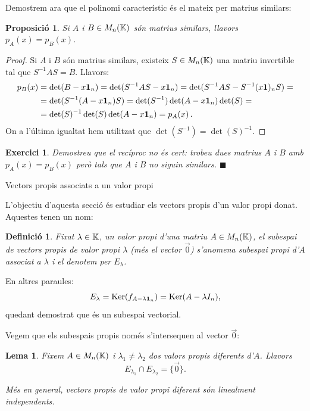 \documentclass[
  11pt,
]{book}
\makeatletter
\numberwithin{dummy}{section}
\theoremstyle{maincolornumbox}
\newtheorem{exerciseT}{Exercici}[chapter]
\theoremstyle{blacknumex}
\theoremstyle{blacknumbox}
\newtheorem{definitionT}{Definició}[chapter]
\theoremstyle{maincolornum}
\newtheorem{propositionT}{Proposició}[chapter]
\newtheorem{lemmaT}{Lema}[chapter]
\newenvironment{proposition}{\begin{pBox}\begin{propositionT}}{\end{propositionT}\end{pBox}}
\newenvironment{lemma}{\begin{pBox}\begin{lemmaT}}{\end{lemmaT}\end{pBox}}
\newenvironment{exercise}{\begin{eBox}\begin{exerciseT}}{\hfill{\color{maincolor}\tiny\ensuremath{\blacksquare}}\end{exerciseT}\end{eBox}}
\newenvironment{definition}{\begin{dBox}\begin{definitionT}}{\end{definitionT}\end{dBox}}
\renewcommand{\section}{\@startsection{section}{1}{\z@}
{-4ex \@plus -1ex \@minus -.4ex}
{1ex \@plus.2ex }
{\normalfont\large\sffamily\bfseries}}
\newlength\esp
\makeatother
\begin{document}
Demostrem ara que el polinomi característic és el mateix per matrius
similars:

\begin{proposition}
Si \(A\) i \(B\in M_n(\mathbb{K})\) són matrius similars, llavors \(p_A(x)=p_B(x)\).
\end{proposition}

\begin{proof}
Si \(A\) i \(B\) són matrius similars, existeix \(S\in M_n(\mathbb{K})\) una
matriu invertible tal que \(S^{-1}AS=B\). Llavors: \begin{align*}
p_B(x) & =\det(B-x\mathbf{1}_n)=\det(S^{-1}AS-x\mathbf{1}_n)=\det(S^{-1}AS-S^{-1}(x\mathbf{1})_nS)=\\ & = \det(S^{-1}(A-x\mathbf{1}_n)S)= \det(S^{-1})\det(A-x\mathbf{1}_n)\det(S)=\\
 & = \det(S)^{-1}\det(S)\det(A-x\mathbf{1}_n) = p_A(x) \, .
\end{align*} On a l'última igualtat hem utilitzat que
\(\det(S^{-1})=\det(S)^{-1}\).
\end{proof}

\begin{exercise}
Demostreu que el recíproc no és cert: trobeu dues matrius \(A\) i \(B\) amb
\(p_A(x)=p_B(x)\) però tals que \(A\) i \(B\) no siguin similars.
\end{exercise}

\section{Vectors propis associats a un valor propi}\label{vectors-propis-associats-a-un-valor-propi}

L'objectiu d'aquesta secció és estudiar els vectors propis d'un valor
propi donat. Aquestes tenen un nom:

\begin{definition}
Fixat \(\lambda\in\mathbb{K}\), un valor propi d'una matriu \(A\in M_n(\mathbb{K})\), el
subespai de vectors propis de valor propi \(\lambda\) (més el vector
\(\vec 0\)) s'anomena \emph{subespai propi d'\(A\) associat a \(\lambda\)} i el
denotem per \(E_\lambda\).
\end{definition}

En altres paraules:
\[E_\lambda=\operatorname{Ker}(f_{A-\lambda\mathbf{1}_n})=\operatorname{Ker}(A-\lambda I_n) ,\] quedant
demostrat que és un subespai vectorial.

Vegem que els subespais propis només s'intersequen al vector \(\vec 0\):

\begin{lemma}
\protect\hypertarget{lem:veps-vap-dif-LI}{}\label{lem:veps-vap-dif-LI}Fixem
\(A\in M_n(\mathbb{K})\) i \(\lambda_1\neq\lambda_2\) dos valors propis diferents
d'\(A\). Llavors \[E_{\lambda_1}\cap E_{\lambda_2}=\{\vec 0\}.\]

Més en general, vectors propis de valor propi diferent són linealment
independents.
\end{lemma}
\end{document}
